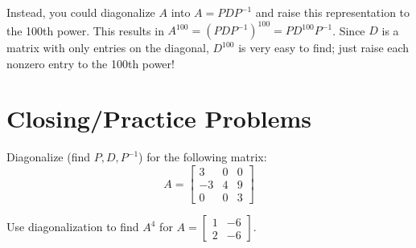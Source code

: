 \documentclass[11pt]{exam}
\begin{document}
    Instead, you could diagonalize $A$ into $A = PDP^{-1}$ and raise this representation to the 100th power.
    This results in $A^{100} = (PDP^{-1})^{100} = PD^{100}P^{-1}$.
    Since $D$ is a matrix with only entries on the diagonal, $D^{100}$ is very easy to find; just raise each nonzero entry to the 100th power!

\vspace{50px}
\section{Closing/Practice Problems}
\begin{questions}
    \item Diagonalize (find $P, D, P^{-1}$) for the following matrix:
    $$A = \begin{bmatrix} 3 & 0 & 0 \\ -3 & 4 & 9 \\ 0 & 0 & 3 \end{bmatrix}$$
    \item Use diagonalization to find $A^4$ for $A = \begin{bmatrix} 1 & -6 \\ 2 & -6 \end{bmatrix}$.
\end{questions}
\end{document}
